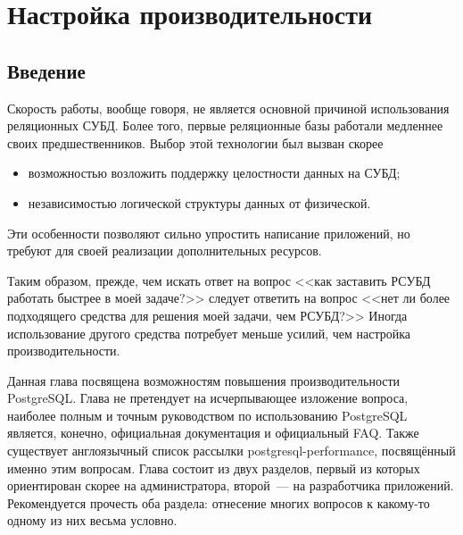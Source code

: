 \chapter{Настройка производительности}
\begin{epigraphs}
\end{epigraphs}
\section{Введение}
Скорость работы, вообще говоря, не является основной причиной использования реляционных СУБД. 
Более того, первые реляционные базы работали медленнее своих предшественников. 
Выбор этой технологии был вызван скорее
\begin{itemize}
\item возможностью возложить поддержку целостности данных на СУБД;
\item независимостью логической структуры данных от физической.
\end{itemize}

Эти особенности позволяют сильно упростить написание приложений, но требуют для 
своей реализации дополнительных ресурсов.

Таким образом, прежде, чем искать ответ на вопрос <<как заставить РСУБД работать быстрее в моей задаче?>> 
следует ответить на вопрос <<нет ли более подходящего средства для решения моей задачи, чем РСУБД?>> 
Иногда использование другого средства потребует меньше усилий, чем настройка производительности.

Данная глава посвящена возможностям повышения производительности PostgreSQL. 
Глава не претендует на исчерпывающее изложение вопроса, наиболее полным и точным руководством по 
использованию PostgreSQL является, конечно, официальная документация и официальный FAQ. 
Также существует англоязычный список рассылки postgresql-performance, посвящённый именно этим вопросам.
Глава состоит из двух разделов, первый из которых ориентирован скорее на администратора, 
второй~--- на разработчика приложений. Рекомендуется прочесть оба раздела: отнесение многих вопросов к 
какому-то одному из них весьма условно.

